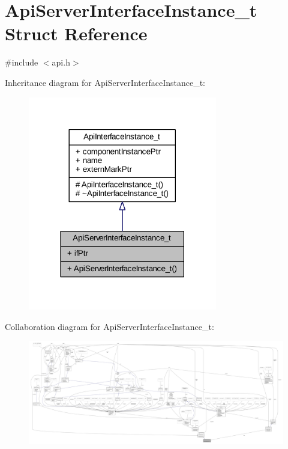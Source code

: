 \hypertarget{struct_api_server_interface_instance__t}{}\section{Api\+Server\+Interface\+Instance\+\_\+t Struct Reference}
\label{struct_api_server_interface_instance__t}


{\ttfamily \#include $<$api.\+h$>$}



Inheritance diagram for Api\+Server\+Interface\+Instance\+\_\+t\+:
\nopagebreak
\begin{figure}[H]
\begin{center}
\leavevmode
\includegraphics[width=234pt]{struct_api_server_interface_instance__t__inherit__graph}
\end{center}
\end{figure}


Collaboration diagram for Api\+Server\+Interface\+Instance\+\_\+t\+:
\nopagebreak
\begin{figure}[H]
\begin{center}
\leavevmode
\includegraphics[width=350pt]{struct_api_server_interface_instance__t__coll__graph}
\end{center}
\end{figure}

